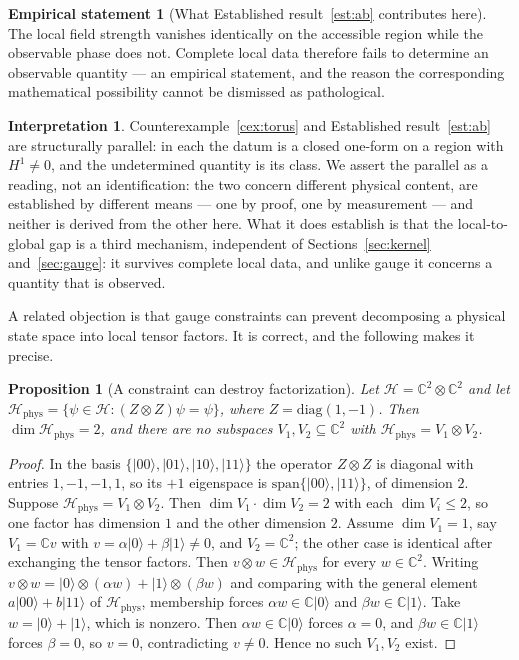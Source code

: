 \documentclass[11pt]{article}
\newtheorem{proposition}[definition]{Proposition}
\theoremstyle{definition}
\newtheorem{interpretation}[definition]{Interpretation}
\newtheorem{empirical}[definition]{Empirical statement}
\newcommand{\ket}[1]{\lvert #1\rangle}
\begin{document}
\begin{empirical}[What Established result~\ref{est:ab} contributes here]
\label{emp:ab}
The local field strength vanishes identically on the accessible region while the
observable phase does not. Complete local data therefore fails to determine an
observable quantity --- an empirical statement, and the reason the corresponding
mathematical possibility cannot be dismissed as pathological.
\end{empirical}

\begin{interpretation}
\label{int:global}
Counterexample~\ref{cex:torus} and Established result~\ref{est:ab} are
structurally parallel: in each the datum is a closed one-form on a region with
$H^1\neq0$, and the undetermined quantity is its class. We assert the parallel
as a reading, not an identification: the two concern different physical content,
are established by different means --- one by proof, one by measurement --- and
neither is derived from the other here. What it does establish is that the
local-to-global gap is a third mechanism, independent of
Sections~\ref{sec:kernel} and~\ref{sec:gauge}: it survives complete local data,
and unlike gauge it concerns a quantity that is observed.
\end{interpretation}

A related objection is that gauge constraints can prevent decomposing a physical
state space into local tensor factors. It is correct, and the following makes it
precise.

\begin{proposition}[A constraint can destroy factorization]
\label{prop:nofactor}
Let $\mathcal H=\mathbb C^2\otimes\mathbb C^2$ and let
$\mathcal H_{\mathrm{phys}}=\{\psi\in\mathcal H:(Z\otimes Z)\psi=\psi\}$, where
$Z=\mathrm{diag}(1,-1)$. Then $\dim\mathcal H_{\mathrm{phys}}=2$, and there are
no subspaces $V_1,V_2\subseteq\mathbb C^2$ with
$\mathcal H_{\mathrm{phys}}=V_1\otimes V_2$.
\end{proposition}
\begin{proof}
In the basis $\{\ket{00},\ket{01},\ket{10},\ket{11}\}$ the operator
$Z\otimes Z$ is diagonal with entries $1,-1,-1,1$, so its $+1$ eigenspace is
$\mathrm{span}\{\ket{00},\ket{11}\}$, of dimension $2$. Suppose
$\mathcal H_{\mathrm{phys}}=V_1\otimes V_2$. Then
$\dim V_1\cdot\dim V_2=2$ with each $\dim V_i\le 2$, so one factor has dimension
$1$ and the other dimension $2$. Assume $\dim V_1=1$, say
$V_1=\mathbb C v$ with $v=\alpha\ket0+\beta\ket1\neq0$, and
$V_2=\mathbb C^2$; the other case is identical after exchanging the tensor
factors. Then $v\otimes w\in\mathcal H_{\mathrm{phys}}$ for every
$w\in\mathbb C^2$. Writing $v\otimes w=\ket0\otimes(\alpha w)+\ket1\otimes(\beta w)$
and comparing with the general element $a\ket{00}+b\ket{11}$ of
$\mathcal H_{\mathrm{phys}}$, membership forces $\alpha w\in\mathbb C\ket0$ and
$\beta w\in\mathbb C\ket1$. Take $w=\ket0+\ket1$, which is nonzero. Then
$\alpha w\in\mathbb C\ket0$ forces $\alpha=0$, and $\beta w\in\mathbb C\ket1$
forces $\beta=0$, so $v=0$, contradicting $v\neq0$. Hence no such $V_1,V_2$
exist.
\end{proof}
\end{document}
